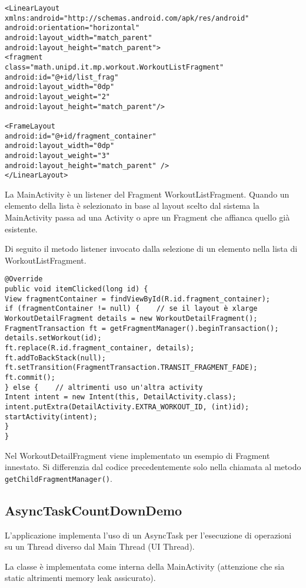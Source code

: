 \begin{lstlisting}
<LinearLayout xmlns:android="http://schemas.android.com/apk/res/android"
android:orientation="horizontal"
android:layout_width="match_parent"
android:layout_height="match_parent">
<fragment
class="math.unipd.it.mp.workout.WorkoutListFragment"
android:id="@+id/list_frag"
android:layout_width="0dp"
android:layout_weight="2"
android:layout_height="match_parent"/>

<FrameLayout
android:id="@+id/fragment_container"
android:layout_width="0dp"
android:layout_weight="3"
android:layout_height="match_parent" />
</LinearLayout>
\end{lstlisting}

La MainActivity è un listener del Fragment WorkoutListFragment. Quando un elemento della lista è selezionato in base al layout scelto dal sistema la MainActivity passa ad una Activity o apre un Fragment che affianca quello già esistente.

Di seguito il metodo listener invocato dalla selezione di un elemento nella lista di WorkoutListFragment.

\begin{lstlisting}
@Override
public void itemClicked(long id) {
View fragmentContainer = findViewById(R.id.fragment_container);
if (fragmentContainer != null) {	// se il layout è xlarge 
WorkoutDetailFragment details = new WorkoutDetailFragment();
FragmentTransaction ft = getFragmentManager().beginTransaction();
details.setWorkout(id);
ft.replace(R.id.fragment_container, details);
ft.addToBackStack(null);
ft.setTransition(FragmentTransaction.TRANSIT_FRAGMENT_FADE);
ft.commit();
} else {	// altrimenti uso un'altra activity
Intent intent = new Intent(this, DetailActivity.class);
intent.putExtra(DetailActivity.EXTRA_WORKOUT_ID, (int)id);
startActivity(intent);
}
}
\end{lstlisting}

Nel WorkoutDetailFragment viene implementato un esempio di Fragment innestato. Si differenzia dal codice precedentemente solo nella chiamata al metodo \lstinline|getChildFragmentManager()|.


\subsection{AsyncTaskCountDownDemo}
L'applicazione implementa l'uso di un AsyncTask per l'esecuzione di operazioni su un Thread diverso dal Main Thread (UI Thread).

La classe è implementata come interna della MainActivity (attenzione che sia static altrimenti memory leak assicurato).

